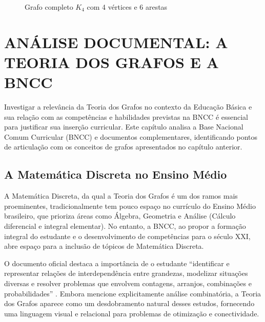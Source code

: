\documentclass[
  12pt,
  oneside,
  a4paper,
  english,
  brazilian
  ]{abntex2}
\theoremstyle{definition}
\def\sffamily{}%
\def\bfseries{}%
\begin{document}
\begin{figure}[!t]
  \centering
  \caption{Grafo completo $K_4$ com 4 vértices e 6 arestas}
  \label{fig:k4}
\end{figure}
\vfill

\chapter{ANÁLISE DOCUMENTAL: A TEORIA DOS GRAFOS E A BNCC}
\label{cap:bncc}

Investigar a relevância da Teoria dos Grafos no contexto da Educação Básica e
sua relação com as competências e habilidades previstas na BNCC é essencial para
justificar sua inserção curricular. Este capítulo analisa a Base Nacional Comum
Curricular (BNCC) e documentos complementares, identificando pontos de
articulação com os conceitos de grafos apresentados no capítulo anterior.

\section{A Matemática Discreta no Ensino Médio}

A Matemática Discreta, da qual a Teoria dos Grafos é um dos ramos mais
proeminentes, tradicionalmente tem pouco espaço no currículo do Ensino Médio
brasileiro, que prioriza áreas como Álgebra, Geometria e Análise (Cálculo
diferencial e integral elementar). No entanto, a BNCC, ao propor a formação
integral do estudante e o desenvolvimento de competências para o século XXI,
abre espaço para a inclusão de tópicos de Matemática Discreta.

O documento oficial destaca a importância de o estudante ``identificar e
representar relações de interdependência entre grandezas, modelizar situações
diversas e resolver problemas que envolvem contagens, arranjos, combinações e
probabilidades'' \cite{brasil2018}. Embora mencione explicitamente análise
combinatória, a Teoria dos Grafos aparece como um desdobramento natural desses
estudos, fornecendo uma linguagem visual e relacional para problemas de
otimização e conectividade.
\end{document}

